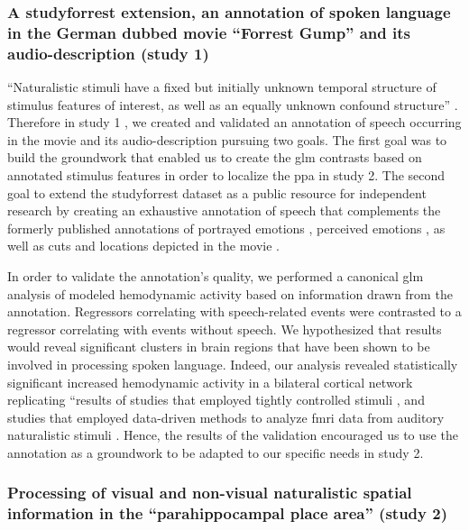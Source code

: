 \subsubsection{A studyforrest extension, an annotation of spoken
language in the German dubbed movie ``Forrest Gump'' and its audio-description
(study 1)}

``Naturalistic stimuli have a fixed but initially unknown temporal structure of
stimulus features of interest, as well as an equally unknown confound
structure'' \citep{haeusler2021speechanno}.
Therefore in study 1 \citep{haeusler2021speechanno}, we created and validated an
annotation of speech occurring in the movie and its audio-description pursuing
two goals.
The first goal was to build the groundwork that enabled us to create the
\ac{glm} contrasts based on annotated stimulus features in order to localize the
\ac{ppa} in study 2.
The second goal to extend the studyforrest dataset as a public resource for
independent research by creating an exhaustive annotation of speech that
complements the formerly published annotations of portrayed emotions
\citep{labs2015portrayed}, perceived emotions \citep{lettieri2019emotionotopy},
as well as cuts and locations depicted in the movie \citep{haeusler2016cutanno}.

In order to validate the annotation's quality, we performed a canonical \ac{glm}
analysis of modeled hemodynamic activity based on information drawn from the
annotation.
Regressors correlating with speech-related events were contrasted to a regressor
correlating with events without speech.
We hypothesized that results would reveal significant clusters in brain regions
that have been shown to be involved in processing spoken language.
Indeed, our analysis revealed statistically significant increased hemodynamic
activity in a bilateral cortical network replicating ``results of studies that
employed tightly controlled stimuli \citep[s.][for reviews]{friederici2011brain,
hickok2007cortical,price2012twentyyears}, and studies that employed data-driven
methods to analyze \ac{fmri} data from auditory naturalistic stimuli
\citep{honey2012not, lerner2011topographic, silbert2014coupled}.
Hence, the results of the validation encouraged us to use the annotation as a
groundwork to be adapted to our specific needs in study 2.


\subsubsection{Processing of visual and non-visual naturalistic spatial
information in the ``parahippocampal place area'' (study 2)}

